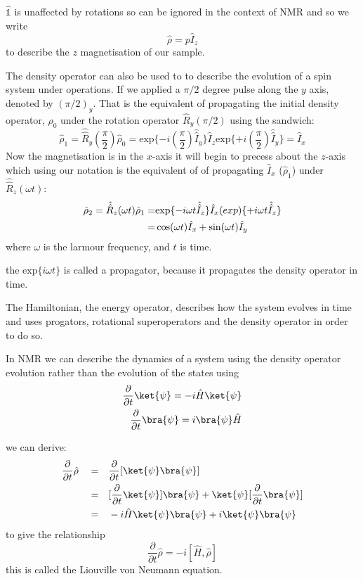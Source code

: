 $\hat{\mathbb{1}}$ is unaffected by rotations so can be ignored in the context of NMR
and so we write
\begin{equation}
  \hat{\rho} = p\hat{I}_z
\end{equation}
to describe the $z$ magnetisation of our sample.

The density operator can also be used to to describe the evolution of a spin system under operations. If we applied a $\pi/2$ degree pulse along the $y$ axis, denoted by $(\pi/2)_y$. That is the equivalent of propagating the initial density operator, $\rho_0$
under the rotation operator $\hat{R}_y(\pi/2)$ using the sandwich:
\begin{equation}
  \hat{\rho}_1 = \hat{\hat{R}}_y(\frac{\pi}{2})\hat\rho_0 = \text{exp}\{-i(\frac{\pi}{2})\hat{\hat{I}}_y\}\hat{I}_z\text{exp}\{+i(\frac{\pi}{2})\hat{\hat{I}}_y\} = \hat{I}_x
\end{equation}
Now the magnetisation is in the $x$-axis it will begin to precess about the $z$-axis which using our notation is the equivalent of of propagating $\hat{I}_x$ ($\hat{\rho}_1$)
under $\hat{\hat{R}}_z(\omega t)$:
\begin{align}\label{eqn:propagate}
  \hat{\rho}_2 = \hat{\hat{R}}_z(\omega t)\hat{\rho}_1 =& \text{exp}\{-i\omega t\hat{\hat{I}}_z\}\hat{I}_x\text(exp)\{+i\omega t\hat{\hat{I}}_z\}\\
   =& \cos(\omega t)\hat{I}_x + \sin(\omega t)\hat{I}_y
\end{align}
where $\omega$ is the larmour frequency, and $t$ is time.

the $\text{exp}\{i\omega t\}$ is called a propagator, because it propagates the density operator in time.

The Hamiltonian, the energy operator, describes how the system evolves in time and uses progators, rotational superoperators and the density operator in order to do so.



In NMR we can  describe the dynamics of a system using the density operator evolution rather than the evolution of the states using
\begin{align}
  \frac{\partial}{\partial{t}}\ket{\psi} = -i\hat{H}\ket{\psi}\\
  \frac{\partial}{\partial{t}}\bra{\psi} = i\bra{\psi}\hat{H}
\end{align}

we can derive\citep{Neumann2018}:
\begin{align}
  \frac{\partial}{\partial{t}}\hat\rho\quad=&\quad \frac{\partial}{\partial{t}}[\ket{\psi}\bra{\psi}]\\
  =&\quad[\frac{\partial}{\partial{t}}\ket{\psi}]\bra{\psi} + \ket{\psi}[\frac{\partial}{\partial{t}}\bra{\psi}]\\
  =&\quad-i\hat{H}\ket{\psi}\bra{\psi} + i\ket{\psi}\bra{\psi}
\end{align}
to give the relationship
\begin{equation}
  \frac{\partial}{\partial{t}}\hat\rho = -i[\hat{H},\hat\rho]
\end{equation}
this is called the Liouville von Neumann equation.

